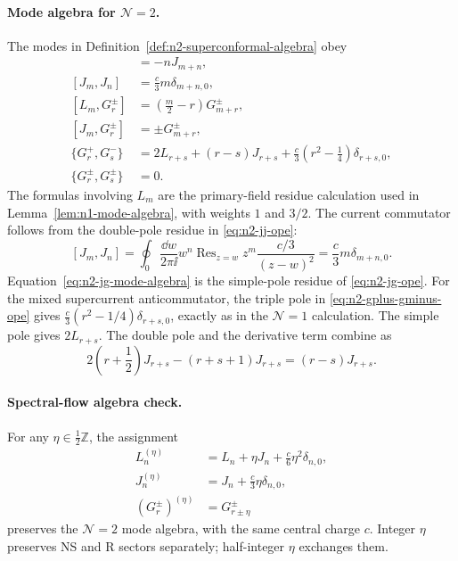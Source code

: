 \paragraph{Mode algebra for \(\mathcal N=2\).}
The modes in Definition~\ref{def:n2-superconformal-algebra} obey
\begin{align}
  [L_m,J_n]&=-nJ_{m+n},
  \label{eq:n2-lj-mode-algebra}\\
  [J_m,J_n]&=\frac c3 m\delta_{m+n,0},
  \label{eq:n2-jj-mode-algebra}\\
  [L_m,G^\pm_r]&=\left(\frac m2-r\right)G^\pm_{m+r},
  \label{eq:n2-lg-mode-algebra}\\
  [J_m,G^\pm_r]&=\pm G^\pm_{m+r},
  \label{eq:n2-jg-mode-algebra}\\
  \{G^+_r,G^-_s\}
  &=
  2L_{r+s}
  +(r-s)J_{r+s}
  +\frac c3\left(r^2-\frac14\right)\delta_{r+s,0},
  \label{eq:n2-gplus-gminus-mode-algebra}\\
  \{G^\pm_r,G^\pm_s\}&=0.
  \label{eq:n2-same-sign-g-mode-algebra}
\end{align}
The formulas involving \(L_m\) are the primary-field residue calculation
used in Lemma~\ref{lem:n1-mode-algebra}, with weights \(1\) and
\(3/2\).  The current commutator follows from the double-pole residue in
\eqref{eq:n2-jj-ope}:
\[
  [J_m,J_n]
  =
  \oint_0\frac{\dd w}{2\pi\ii}w^n
  \operatorname{Res}_{z=w}
  z^m\frac{c/3}{(z-w)^2}
  =
  \frac c3 m\delta_{m+n,0}.
\]
Equation~\eqref{eq:n2-jg-mode-algebra} is the simple-pole residue of
\eqref{eq:n2-jg-ope}.  For the mixed supercurrent anticommutator, the
triple pole in \eqref{eq:n2-gplus-gminus-ope} gives
\(\frac c3(r^2-1/4)\delta_{r+s,0}\), exactly as in the
\(\mathcal N=1\) calculation.  The simple pole gives \(2L_{r+s}\).  The
double pole and the derivative term combine as
\[
  2\left(r+\frac12\right)J_{r+s}
  -
  (r+s+1)J_{r+s}
  =
  (r-s)J_{r+s}.
\]

\paragraph{Spectral-flow algebra check.}
For any \(\eta\in\frac12\mathbb Z\), the assignment
\begin{align}
  L_n^{(\eta)}
  &=
  L_n+\eta J_n+\frac c6\eta^2\delta_{n,0},
  \label{eq:n2-spectral-flow-l}\\
  J_n^{(\eta)}
  &=
  J_n+\frac c3\eta\delta_{n,0},
  \label{eq:n2-spectral-flow-j}\\
  (G^\pm_r)^{(\eta)}
  &=
  G^\pm_{r\pm\eta}
  \label{eq:n2-spectral-flow-g}
\end{align}
preserves the \(\mathcal N=2\) mode algebra, with the same central charge
\(c\).  Integer \(\eta\) preserves NS and R sectors separately; half-integer
\(\eta\) exchanges them.

